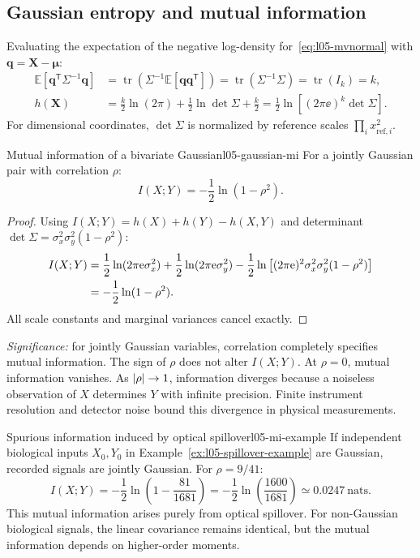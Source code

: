 \subsection{Gaussian entropy and mutual information}
\label{subsec:l05-gaussian-mi}
Evaluating the expectation of the negative log-density for~\eqref{eq:l05-mvnormal} with $\mathbf q=\mathbf X-\boldsymbol\mu$:
\begin{align}
\mathbb E[\mathbf q^{\mathsf T}\Sigma^{-1}\mathbf q]
&=\operatorname{tr}\left(\Sigma^{-1}\mathbb E[\mathbf q\mathbf q^{\mathsf T}]\right)
=\operatorname{tr}(\Sigma^{-1}\Sigma)=\operatorname{tr}(I_k)=k,\label{eq:l05-quadratic-expectation}\\
h(\mathbf X)&=\frac k2\ln(2\pi)+\frac12\ln\det\Sigma+\frac k2
=\frac12\ln\left[(2\pi\ee)^k\det\Sigma\right].
\label{eq:l05-mv-entropy}
\end{align}
For dimensional coordinates, $\det\Sigma$ is normalized by reference scales $\prod_i x_{\mathrm{ref},i}^2$.

\begin{proposition}{Mutual information of a bivariate Gaussian}{l05-gaussian-mi}
For a jointly Gaussian pair with correlation $\rho$:
\begin{equation}
\boxed{I(X;Y)=-\frac12\ln(1-\rho^2)}.
\label{eq:l05-gaussian-mi}
\end{equation}
\end{proposition}
\begin{proof}
Using $I(X;Y)=h(X)+h(Y)-h(X,Y)$ and determinant $\det\Sigma=\sigma_x^2\sigma_y^2(1-\rho^2)$:
\begin{align}
I(X;Y)
&=\frac12\ln(2\pi\mathrm{e}\sigma_x^2)
 +\frac12\ln(2\pi\mathrm{e}\sigma_y^2)
 -\frac12\ln\left[(2\pi\mathrm{e})^2\sigma_x^2\sigma_y^2(1-\rho^2)\right] \notag\\
&=-\frac12\ln(1-\rho^2).
\label{eq:l05-mi-cancellation}
\end{align}
All scale constants and marginal variances cancel exactly.
\end{proof}
\textit{Significance:} for jointly Gaussian variables, correlation completely specifies mutual information. The sign of $\rho$ does not alter $I(X;Y)$. At $\rho=0$, mutual information vanishes. As $\lvert\rho\rvert\to1$, information diverges because a noiseless observation of $X$ determines $Y$ with infinite precision. Finite instrument resolution and detector noise bound this divergence in physical measurements.

\begin{example}{Spurious information induced by optical spillover}{l05-mi-example}
If independent biological inputs $X_0, Y_0$ in Example~\ref{ex:l05-spillover-example} are Gaussian, recorded signals are jointly Gaussian. For $\rho=9/41$:
\begin{equation}
I(X;Y)=-\frac12\ln\left(1-\frac{81}{1681}\right)
=-\frac12\ln\left(\frac{1600}{1681}\right)\simeq0.0247\ \text{nats}.
\label{eq:l05-mi-numeric}
\end{equation}
This mutual information arises purely from optical spillover. For non-Gaussian biological signals, the linear covariance remains identical, but the mutual information depends on higher-order moments.
\end{example}

